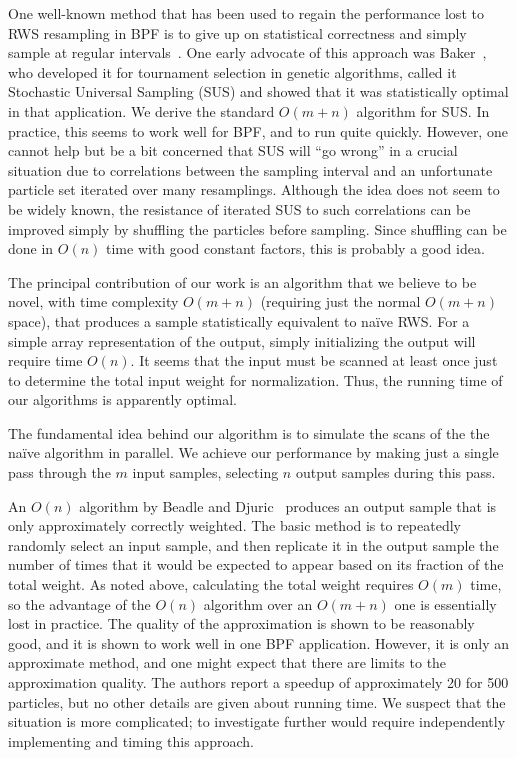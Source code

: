 \documentclass[12pt]{article}
\begin{document}
  One well-known method that has been used to regain the
  performance lost to RWS resampling in BPF is to give up on
  statistical correctness and simply sample at regular
  intervals~\cite{kitagawa}.  One early advocate of this
  approach was Baker~\cite{baker}, who developed it for
  tournament selection in genetic algorithms, called it
  Stochastic Universal Sampling (SUS) and showed that it was
  statistically optimal in that application.  We derive the
  standard $O(m + n)$ algorithm for SUS.  In practice, this
  seems to work well for BPF, and to run quite quickly.
  However, one cannot help but be a bit concerned that SUS
  will ``go wrong'' in a crucial situation due to
  correlations between the sampling interval and an
  unfortunate particle set iterated over many resamplings.
  Although the idea does not seem to be widely known, the
  resistance of iterated SUS to such correlations can be
  improved simply by shuffling the particles before
  sampling.  Since shuffling can be done in $O(n)$ time with
  good constant factors, this is probably a good idea.

  The principal contribution of our work is an algorithm
  that we believe to be novel, with time complexity $O(m +
  n)$ (requiring just the normal $O(m + n)$ space), that
  produces a sample statistically equivalent to na\"ive
  RWS. For a simple array representation of the output,
  simply initializing the output will require time $O(n)$.
  It seems that the input must be scanned at least once just
  to determine the total input weight for normalization.
  Thus, the running time of our algorithms is apparently
  optimal.

  The fundamental idea behind our algorithm is to simulate
  the scans of the the na\"ive algorithm in parallel.  We
  achieve our performance by making just a single pass
  through the $m$ input samples, selecting $n$ output
  samples during this pass.

  An $O(n)$ algorithm by Beadle and Djuric~\cite{recount}
  produces an output sample that is only approximately
  correctly weighted.  The basic method is to repeatedly
  randomly select an input sample, and then replicate it in
  the output sample the number of times that it would be
  expected to appear based on its fraction of the total
  weight.  As noted above, calculating the total weight
  requires $O(m)$ time, so the advantage of the $O(n)$
  algorithm over an $O(m + n)$ one is essentially lost in
  practice.  The quality of the approximation is shown to be
  reasonably good, and it is shown to work well in one BPF
  application.  However, it is only an approximate method,
  and one might expect that there are limits to the
  approximation quality.  The authors report a speedup of
  approximately 20 for 500 particles, but no other details
  are given about running time.  We suspect that the
  situation is more complicated; to investigate further
  would require independently implementing and timing this
  approach.
\end{document}
